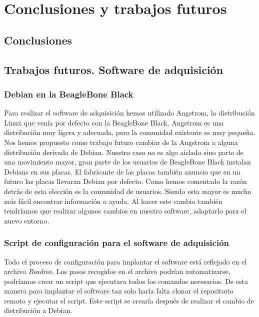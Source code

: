 \chapter{Conclusiones y trabajos futuros}
\label{cap_conclusiones}

\section{Conclusiones}
\section{Trabajos futuros. Software de adquisición}
	\subsection{Debian en la BeagleBone Black}
	Para realizar el software de adquisición hemos utilizado Angstrom, la distribución Linux que venía por defecto con la BeagleBone Black.
	Angstrom es una distribución muy ligera y adecuada, pero la comunidad existente es muy pequeña. Nos hemos propuesto como trabajo futuro
	cambiar de la Angstrom a alguna distribución derivada de Debian. Nuestro caso no es algo aislado sino parte de una movimiento mayor, gran
	parte de los usuarios  de BeagleBone Black instalan Debians en sus placas. El fabricante de las placas también anuncio que en un futuro las
	placas llevaran Debian por defecto. Como hemos comentado la razón detrás de esta elección es la comunidad de usuarios. Siendo esta mayor es
	mucho más fácil encontrar información o ayuda. Al hacer este cambio también tendríamos que realizar algunos cambios en nuestro software,
	adaptarlo para el nuevo entorno.
	\subsection{Script de configuración para el software de adquisición}
	Todo el proceso de configuración para implantar el software está reflejado en el archivo \emph{Readme}. Los pasos recogidos en el archivo
	podrían automatizarse, podríamos crear un script que ejecutara todos los comandos necesarios. De esta manera para implantar el software tan
	solo haría falta clonar el repositorio remoto y ejecutar el script. Este script se crearía después de realizar el cambio de distribución a
	Debian.
